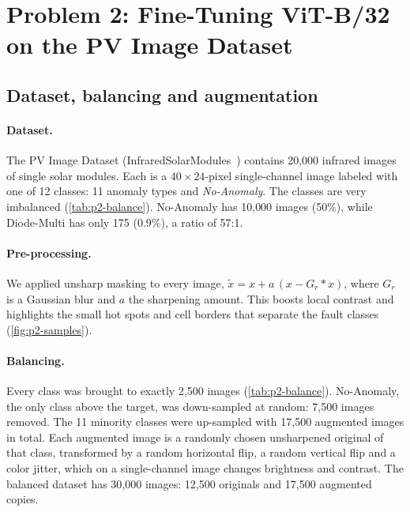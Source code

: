 \section{Problem 2: Fine-Tuning ViT-B/32 on the PV Image Dataset}
\label{sec:p2}

\subsection{Dataset, balancing and augmentation}
\label{sec:p2-data}

\paragraph{Dataset.}
The PV Image Dataset (InfraredSolarModules~\cite{millendorf2020pv}) contains 20{,}000 infrared images of single solar modules.
Each is a $40\times24$-pixel single-channel image labeled with one of 12 classes: 11 anomaly types and \emph{No-Anomaly}.
The classes are very imbalanced (\cref{tab:p2-balance}).
No-Anomaly has 10{,}000 images (50\%), while Diode-Multi has only 175 (0.9\%), a ratio of 57:1.

\paragraph{Pre-processing.}
We applied unsharp masking to every image, $\tilde x = x + a\,(x - G_r * x)$, where $G_r$ is a Gaussian blur and $a$ the sharpening amount.
This boosts local contrast and highlights the small hot spots and cell borders that separate the fault classes (\cref{fig:p2-samples}).

\paragraph{Balancing.}
Every class was brought to exactly 2{,}500 images (\cref{tab:p2-balance}).
No-Anomaly, the only class above the target, was down-sampled at random: 7{,}500 images removed.
The 11 minority classes were up-sampled with 17{,}500 augmented images in total.
Each augmented image is a randomly chosen unsharpened original of that class, transformed by a random horizontal flip, a random vertical flip and a color jitter, which on a single-channel image changes brightness and contrast.
The balanced dataset has 30{,}000 images: 12{,}500 originals and 17{,}500 augmented copies.

